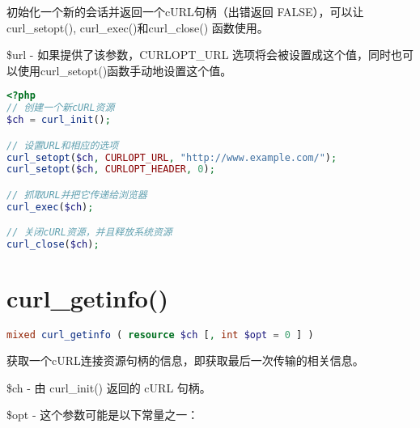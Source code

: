 初始化一个新的会话并返回一个cURL句柄（出错返回 FALSE），可以让curl\_setopt(), curl\_exec()和curl\_close() 函数使用。

\begin{compactitem}
\item \$url - 如果提供了该参数，CURLOPT\_URL 选项将会被设置成这个值，同时也可以使用curl\_setopt()函数手动地设置这个值。
\end{compactitem}


\begin{lstlisting}[language=PHP]
<?php
// 创建一个新cURL资源
$ch = curl_init();

// 设置URL和相应的选项
curl_setopt($ch, CURLOPT_URL, "http://www.example.com/");
curl_setopt($ch, CURLOPT_HEADER, 0);

// 抓取URL并把它传递给浏览器
curl_exec($ch);

// 关闭cURL资源，并且释放系统资源
curl_close($ch);
\end{lstlisting}

\section{curl\_getinfo()}



\begin{lstlisting}[language=PHP]
mixed curl_getinfo ( resource $ch [, int $opt = 0 ] )
\end{lstlisting}


获取一个cURL连接资源句柄的信息，即获取最后一次传输的相关信息。



\begin{compactitem}
\item \$ch - 由 curl\_init() 返回的 cURL 句柄。

\item \$opt - 这个参数可能是以下常量之一：
\end{compactitem}

